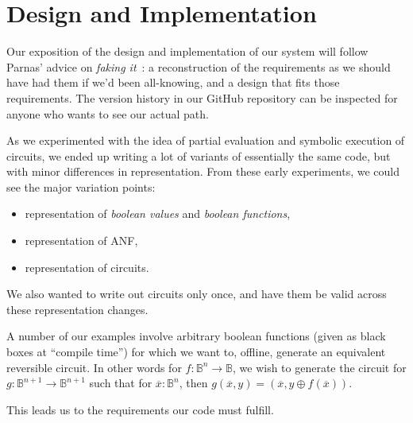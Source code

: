 \documentclass[sigplan,review]{acmart}
\newcommand{\Bool}{\ensuremath{\mathbb{B}}}
\theoremstyle{definition}
\begin{document}
\section{Design and Implementation}
\label{sec4}

Our exposition of the design and implementation of our system will
follow Parnas' advice on \emph{faking it}~\cite{parnas1986rational}: a reconstruction
of the requirements as we should have had them if we'd been all-knowing,
and a design that fits those requirements. The version history in our GitHub
repository can be inspected for anyone who wants to see our actual path.

As we experimented with the idea of partial evaluation and symbolic
execution of circuits, we ended up writing a lot of variants of
essentially the same code, but with minor differences in representation.
From these early experiments, we could see the major variation points:
\begin{itemize}
  \item representation of \emph{boolean values} and \emph{boolean functions},
  \item representation of ANF,
  \item representation of circuits.
\end{itemize}
We also wanted to write out circuits only once, and have them be valid
across these representation changes.

A number of our examples involve arbitrary boolean functions (given as black
boxes at ``compile time'') for which we want to, offline, generate an
equivalent reversible circuit. In other words for $f : \Bool^n \rightarrow\Bool$,
we wish to generate the circuit for $g : \Bool^{n+1} \rightarrow \Bool^{n+1}$ such
that for $\overline{x} : \Bool^n$, then 
$g(\overline{x},y) = (\overline{x}, y \oplus f(\overline{x}))$.

This leads us to the requirements our code must fulfill.
\end{document}
